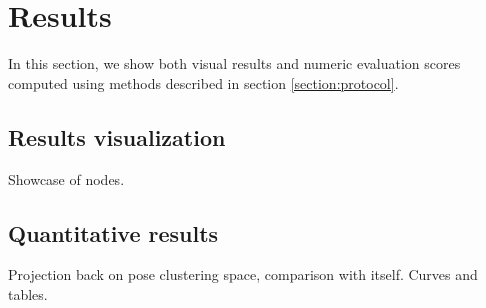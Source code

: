 \section{Results}
In this section, we show both visual results and numeric evaluation scores computed using methods described in section \ref{section:protocol}.
\subsection{Results visualization}
Showcase of nodes.
\subsection{Quantitative results}
Projection back on pose clustering space, comparison with itself. 
Curves and tables.